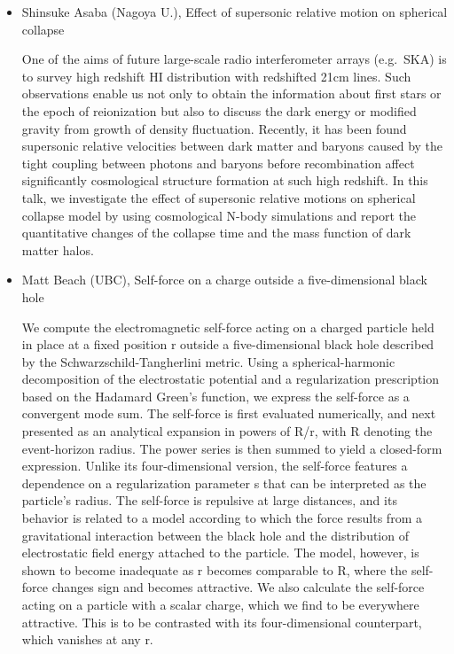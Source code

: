 \documentclass[letterpaper,12pt]{article}
\newcommand{\talk}[2]{{\fontspec{Lato Bold} #1,} {\fontspec{Lato Light Italic} #2}}
\begin{document}
\begin{itemize}
\setlength\itemsep{0pt}

\item \talk{Shinsuke Asaba (Nagoya U.)}{Effect of supersonic relative motion on spherical collapse}

One of the aims of future large-scale radio interferometer arrays (e.g.\ SKA) is to survey high redshift HI distribution with redshifted 21cm lines. Such observations enable us not only to obtain the information about first stars or the epoch of reionization but also to discuss the dark energy or modified gravity from growth of density fluctuation. Recently, it has been found supersonic relative velocities between dark matter and baryons caused by the tight coupling between photons and baryons before recombination affect significantly cosmological structure formation at such high redshift. In this talk, we investigate the effect of supersonic relative motions on spherical collapse model by using cosmological N-body simulations and report the quantitative changes of the collapse time and the mass function of dark matter halos.

\item \talk{Matt Beach (UBC)}{Self-force on a charge outside a five-dimensional black hole}

We compute the electromagnetic self-force acting on a charged particle held in place at a fixed position r outside a five-dimensional black hole described by the Schwarzschild-Tangherlini metric. Using a spherical-harmonic decomposition of the electrostatic potential and a regularization prescription based on the Hadamard Green's function, we express the self-force as a convergent mode sum. The self-force is first evaluated numerically, and next presented as an analytical expansion in powers of R/r, with R denoting the event-horizon radius. The power series is then summed to yield a closed-form expression. Unlike its four-dimensional version, the self-force features a dependence on a regularization parameter s that can be interpreted as the particle's radius. The self-force is repulsive at large distances, and its behavior is related to a model according to which the force results from a gravitational interaction between the black hole and the distribution of electrostatic field energy attached to the particle. The model, however, is shown to become inadequate as r becomes comparable to R, where the self-force changes sign and becomes attractive. We also calculate the self-force acting on a particle with a scalar charge, which we find to be everywhere attractive. This is to be contrasted with its four-dimensional counterpart, which vanishes at any r. 


\end{itemize}
\end{document}
